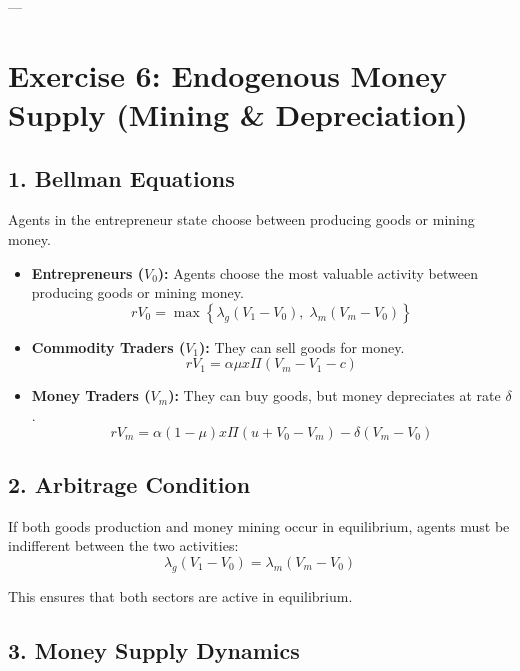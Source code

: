 \documentclass[11pt, a4paper]{article}
\begin{document}
---

\section*{Exercise 6: Endogenous Money Supply (Mining \& Depreciation)}

\subsection*{1. Bellman Equations}

Agents in the entrepreneur state choose between producing goods or mining money.

\begin{itemize}
    \item \textbf{Entrepreneurs ($V_0$):} Agents choose the most valuable activity between producing goods or mining money.
    \begin{equation}
        rV_0 = \max \left\{ \lambda_g (V_1 - V_0), \; \lambda_m (V_m - V_0) \right\}
    \end{equation}

    \item \textbf{Commodity Traders ($V_1$):} They can sell goods for money.
    \begin{equation}
        rV_1 = \alpha \mu x \Pi (V_m - V_1 - c)
    \end{equation}

    \item \textbf{Money Traders ($V_m$):} They can buy goods, but money depreciates at rate $\delta$.
    \begin{equation}
        rV_m = \alpha (1-\mu)x \Pi (u + V_0 - V_m) - \delta (V_m - V_0)
    \end{equation}
\end{itemize}

\subsection*{2. Arbitrage Condition}

If both goods production and money mining occur in equilibrium, agents must be indifferent between the two activities:
\begin{equation}
    \lambda_g (V_1 - V_0) = \lambda_m (V_m - V_0)
\end{equation}

This ensures that both sectors are active in equilibrium.

\subsection*{3. Money Supply Dynamics}
\end{document}
